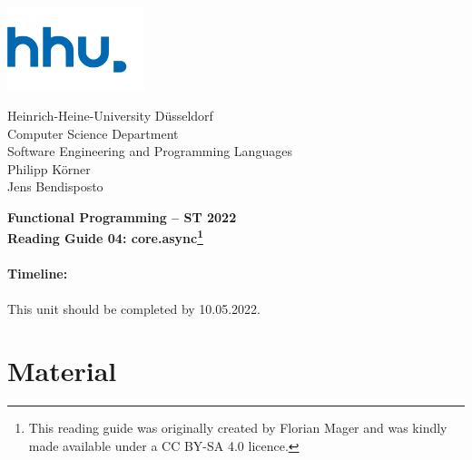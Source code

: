 \documentclass[11pt,a4paper]{article}
\begin{document}
\begin{minipage}[b]{\textwidth}
	\parbox[t]{5cm}{%
		\includegraphics[width=4cm]{unilogo}
		\hfill
	}
	\parbox[b]{11cm}{%
		Heinrich-Heine-University D\"usseldorf\\
		Computer Science Department\\
		Software Engineering and Programming Languages\\
		Philipp K\"orner \\
        Jens Bendisposto
	}
\end{minipage}
\begin{center}
	\bf
	Functional Programming -- ST 2022\\
    Reading Guide 04: core.async\footnote{This reading guide was originally created by Florian Mager and was kindly made available under a CC BY-SA 4.0 licence.}
\end{center}

\pagestyle{empty}

\paragraph{Timeline:} This unit should be completed by 10.05.2022.

\section{Material} 
\end{document}
